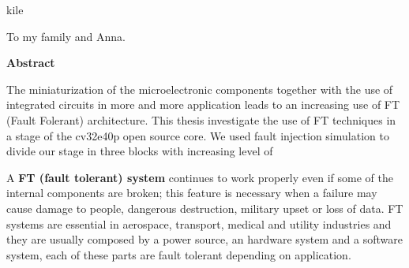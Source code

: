 \documentclass[corpo=11pt,english,numerazioneromana]{toptesi}
\begin{document}
kile

\frontmatter

\begin{flushright}
\noindent
To my family and Anna.
\end{flushright}
\cleardoublepage

\begin{flushright}
\noindent

\end{flushright}
\cleardoublepage


\ringraziamenti

\newpage
{\Huge \textbf{Abstract} \par}
\vspace{.3in}
The miniaturization of the microelectronic components together with the use of integrated circuits in more and more application leads to an increasing use of FT (Fault Folerant) architecture. This thesis investigate the use of FT techniques in a stage of the cv32e40p open source core. We used fault injection simulation to divide our stage in three blocks with increasing level of    


\sommario
A \textbf{ FT (fault tolerant) system} continues to work properly even if some of the internal components are broken; this feature is necessary when a failure may cause damage to people, dangerous destruction, military upset or loss of data. FT systems are essential in aerospace, transport, medical and utility industries and they are usually composed by a power source, an hardware system and a software system, each of these parts are fault tolerant depending on application.
\end{document}
